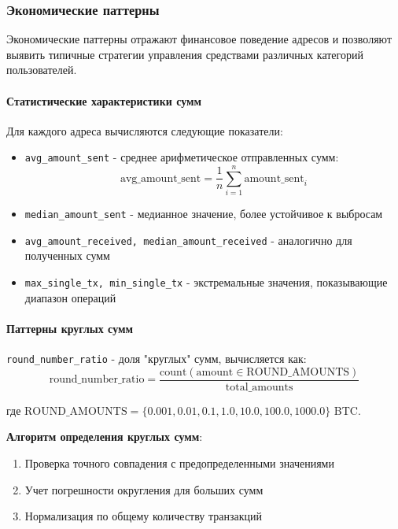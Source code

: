 \subsubsection{Экономические паттерны}

Экономические паттерны отражают финансовое поведение адресов и позволяют выявить типичные стратегии управления средствами различных категорий пользователей.

\paragraph{Статистические характеристики сумм}

Для каждого адреса вычисляются следующие показатели:

\begin{itemize}
    \item \texttt{avg\_amount\_sent} - среднее арифметическое отправленных сумм:
    \begin{equation}
        \text{avg\_amount\_sent} = \frac{1}{n} \sum_{i=1}^{n} \text{amount\_sent}_i
    \end{equation}
    
    \item \texttt{median\_amount\_sent} - медианное значение, более устойчивое к выбросам
    
    \item \texttt{avg\_amount\_received, median\_amount\_received} - аналогично для полученных сумм
    
    \item \texttt{max\_single\_tx, min\_single\_tx} - экстремальные значения, показывающие диапазон операций
\end{itemize}

\paragraph{Паттерны круглых сумм}

\texttt{round\_number\_ratio} - доля "круглых" сумм, вычисляется как:
\begin{equation}
    \text{round\_number\_ratio} = \frac{\text{count}(\text{amount} \in \text{ROUND\_AMOUNTS})}{\text{total\_amounts}}
\end{equation}

где $\text{ROUND\_AMOUNTS} = \{0.001, 0.01, 0.1, 1.0, 10.0, 100.0, 1000.0\}$ BTC.

\textbf{Алгоритм определения круглых сумм}:
\begin{enumerate}
    \item Проверка точного совпадения с предопределенными значениями
    \item Учет погрешности округления для больших сумм
    \item Нормализация по общему количеству транзакций
\end{enumerate}

